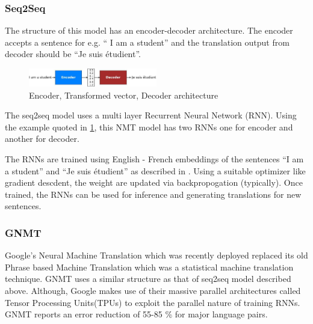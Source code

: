 \documentclass[twocolumn,10pt]{article}
\begin{document}
\subsubsection{Seq2Seq}
The structure of this model has an encoder-decoder architecture. The encoder accepts a sentence for e.g. `` I am a student'' and the translation output from decoder should be ``Je suis \'etudient''. 
\begin{figure}[h]
\includegraphics[width=0.5\textwidth]{encdec.jpg}
\caption{Encoder, Transformed vector, Decoder architecture\cite{NMTtut}}
\label{fig:encdec}
\end{figure}
\par
The seq2seq model uses a multi layer Recurrent Neural Network (RNN). Using the example quoted in \ref{fig:encdec}, this NMT model has two RNNs one for encoder and another for decoder.
\par
The RNNs are trained using English - French embeddings of the sentences ``I am a student'' and ``Je suis \'etudient'' as described in \cite{NMTtut}. Using a suitable optimizer like gradient descdent, the weight are updated via backpropogation (typically). Once trained, the RNNs can be used for inference and generating translations for new sentences.
\subsubsection{GNMT}
Google's Neural Machine Translation which was recently deployed replaced its old Phrase based Machine Translation which was a statistical machine translation technique. GNMT uses a similar structure as that of seq2seq model described above. Although, Google makes use of their massive parallel architectures called Tensor Processing Units(TPUs) to exploit the parallel nature of training RNNs. GNMT reports an error reduction of 55-85 \% for major language pairs\cite{goog}.


 
\end{document}
